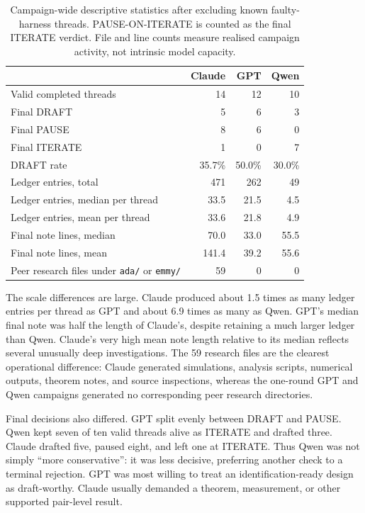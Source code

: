 \documentclass[11pt,a4paper]{article}
\newcommand{\file}[1]{\texttt{#1}}
\begin{document}
\begin{table}[ht]
\centering
\small
\begin{tabular}{lrrr}
\toprule
 & Claude & GPT & Qwen \\
\midrule
Valid completed threads & 14 & 12 & 10 \\
Final DRAFT & 5 & 6 & 3 \\
Final PAUSE & 8 & 6 & 0 \\
Final ITERATE & 1 & 0 & 7 \\
DRAFT rate & 35.7\% & 50.0\% & 30.0\% \\
Ledger entries, total & 471 & 262 & 49 \\
Ledger entries, median per thread & 33.5 & 21.5 & 4.5 \\
Ledger entries, mean per thread & 33.6 & 21.8 & 4.9 \\
Final note lines, median & 70.0 & 33.0 & 55.5 \\
Final note lines, mean & 141.4 & 39.2 & 55.6 \\
Peer research files under \file{ada/} or \file{emmy/} & 59 & 0 & 0 \\
\bottomrule
\end{tabular}
\caption{Campaign-wide descriptive statistics after excluding known faulty-
harness threads.  PAUSE-ON-ITERATE is counted as the final ITERATE verdict.
File and line counts measure realised campaign activity, not intrinsic model
capacity.}
\end{table}

The scale differences are large.  Claude produced about 1.5 times as many
ledger entries per thread as GPT and about 6.9 times as many as Qwen.  GPT's
median final note was half the length of Claude's, despite retaining a much
larger ledger than Qwen.  Claude's very high mean note length relative to its
median reflects several unusually deep investigations.  The 59 research files
are the clearest operational difference: Claude generated simulations,
analysis scripts, numerical outputs, theorem notes, and source inspections,
whereas the one-round GPT and Qwen campaigns generated no corresponding peer
research directories.

Final decisions also differed.  GPT split evenly between DRAFT and PAUSE.
Qwen kept seven of ten valid threads alive as ITERATE and drafted three.  Claude
drafted five, paused eight, and left one at ITERATE.  Thus Qwen was not simply
``more conservative'': it was less decisive, preferring another check to a
terminal rejection.  GPT was most willing to treat an identification-ready
design as draft-worthy.  Claude usually demanded a theorem, measurement, or
other supported pair-level result.
\end{document}
